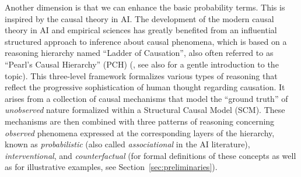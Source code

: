 \documentclass[a4paper,UKenglish,cleveref, autoref, thm-restate]{lipics-v2021}
\begin{document}
Another dimension is that we can enhance the basic probability terms. This is inspired by the causal theory in AI.
The development of the modern causal theory in AI and empirical sciences has greatly benefited from an influential 
structured approach to inference about causal phenomena, which is based on a reasoning 
hierarchy named ``Ladder of Causation'', also often referred to as ``Pearl’s Causal Hierarchy'' 
(PCH) (\cite{shpitser2008complete,Pearl2009,bareinboim2022pearl}, see also  \cite{pearl2018book}
for a gentle introduction to the topic). This three-level framework formalizes various types of reasoning 
that reflect the progressive sophistication of human thought regarding causation. It arises from a 
collection of causal mechanisms that model the ``ground truth'' of \emph{unobserved} nature
formalized within a Structural Causal Model (SCM). These mechanisms are then combined 
with three patterns of reasoning concerning \emph{observed} phenomena expressed at the 
corresponding layers of the hierarchy, known as \emph{probabilistic} (also called 
\emph{associational} in the AI literature), 
\emph{interventional},  and \emph{counterfactual} (for formal definitions of these concepts as well as for illustrative examples, see 
Section~\ref{sec:preliminaries}).
\end{document}
